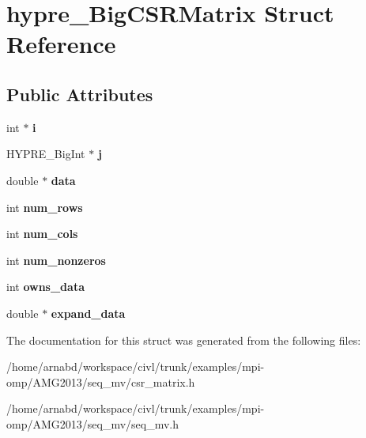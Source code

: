 \hypertarget{structhypre__BigCSRMatrix}{}\section{hypre\+\_\+\+Big\+C\+S\+R\+Matrix Struct Reference}
\label{structhypre__BigCSRMatrix}
\subsection*{Public Attributes}
\begin{DoxyCompactItemize}
\item 
\hypertarget{structhypre__BigCSRMatrix_a1b7208153c35edcd397f19b1fb6e17d1}{}int $\ast$ {\bfseries i}\label{structhypre__BigCSRMatrix_a1b7208153c35edcd397f19b1fb6e17d1}

\item 
\hypertarget{structhypre__BigCSRMatrix_af8a7b4fb03d0a831b3991d1da23da479}{}H\+Y\+P\+R\+E\+\_\+\+Big\+Int $\ast$ {\bfseries j}\label{structhypre__BigCSRMatrix_af8a7b4fb03d0a831b3991d1da23da479}

\item 
\hypertarget{structhypre__BigCSRMatrix_a3939b9ca2aae7f366aea3e3e4290d9e1}{}double $\ast$ {\bfseries data}\label{structhypre__BigCSRMatrix_a3939b9ca2aae7f366aea3e3e4290d9e1}

\item 
\hypertarget{structhypre__BigCSRMatrix_a566b6ddf2ed46b59266377b7fa171cb1}{}int {\bfseries num\+\_\+rows}\label{structhypre__BigCSRMatrix_a566b6ddf2ed46b59266377b7fa171cb1}

\item 
\hypertarget{structhypre__BigCSRMatrix_aedfc458a02386b19ebe10517503d2ee0}{}int {\bfseries num\+\_\+cols}\label{structhypre__BigCSRMatrix_aedfc458a02386b19ebe10517503d2ee0}

\item 
\hypertarget{structhypre__BigCSRMatrix_ac06adc69b0a3cfd2d789e9119f0d2989}{}int {\bfseries num\+\_\+nonzeros}\label{structhypre__BigCSRMatrix_ac06adc69b0a3cfd2d789e9119f0d2989}

\item 
\hypertarget{structhypre__BigCSRMatrix_a1d914107233de16d94f0b7d4cc73db7f}{}int {\bfseries owns\+\_\+data}\label{structhypre__BigCSRMatrix_a1d914107233de16d94f0b7d4cc73db7f}

\item 
\hypertarget{structhypre__BigCSRMatrix_ad408fecb1181713a83101b24fb3fe2c3}{}double $\ast$ {\bfseries expand\+\_\+data}\label{structhypre__BigCSRMatrix_ad408fecb1181713a83101b24fb3fe2c3}

\end{DoxyCompactItemize}


The documentation for this struct was generated from the following files\+:\begin{DoxyCompactItemize}
\item 
/home/arnabd/workspace/civl/trunk/examples/mpi-\/omp/\+A\+M\+G2013/seq\+\_\+mv/csr\+\_\+matrix.\+h\item 
/home/arnabd/workspace/civl/trunk/examples/mpi-\/omp/\+A\+M\+G2013/seq\+\_\+mv/seq\+\_\+mv.\+h\end{DoxyCompactItemize}
